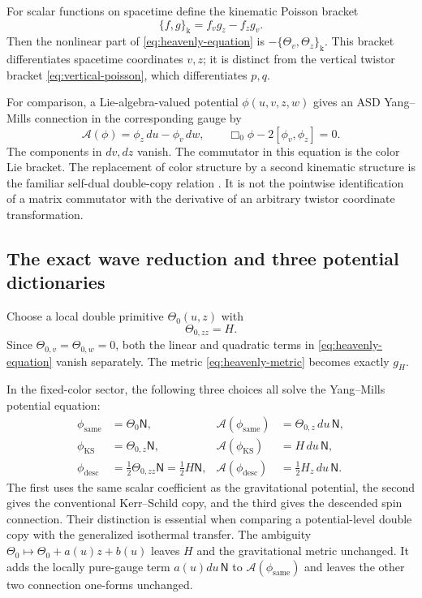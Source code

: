 \documentclass[11pt]{article}
\numberwithin{equation}{section}
\theoremstyle{definition}
\theoremstyle{remark}
\newcommand{\NN}{\mathsf N}
\newcommand{\KS}{\mathrm{KS}}
\begin{document}
For scalar functions on spacetime define the kinematic Poisson bracket
\begin{equation}\label{eq:kinematic-bracket}
\{f,g\}_{\mathrm k}=f_vg_z-f_zg_v.
\end{equation}
Then the nonlinear part of \eqref{eq:heavenly-equation} is $-\{\Theta_v,\Theta_z\}_{\mathrm k}$. This bracket differentiates spacetime coordinates $v,z$; it is distinct from the vertical twistor bracket \eqref{eq:vertical-poisson}, which differentiates $p,q$.

For comparison, a Lie-algebra-valued potential $\phi(u,v,z,w)$ gives an ASD Yang--Mills connection in the corresponding gauge by
\begin{equation}\label{eq:YM-potential}
\mathcal A(\phi)=\phi_z\,du-\phi_v\,dw,
\qquad \Box_0\phi-2[\phi_v,\phi_z]=0.
\end{equation}
The components in $dv,dz$ vanish. The commutator in this equation is the color Lie bracket. The replacement of color structure by a second kinematic structure is the familiar self-dual double-copy relation \cite{MO,BGS}. It is not the pointwise identification of a matrix commutator with the derivative of an arbitrary twistor coordinate transformation.

\subsection{The exact wave reduction and three potential dictionaries}

Choose a local double primitive $\Theta_0(u,z)$ with
\begin{equation}\label{eq:wave-potential}
\Theta_{0,zz}=H.
\end{equation}
Since $\Theta_{0,v}=\Theta_{0,w}=0$, both the linear and quadratic terms in \eqref{eq:heavenly-equation} vanish separately. The metric \eqref{eq:heavenly-metric} becomes exactly $g_H$.

In the fixed-color sector, the following three choices all solve the Yang--Mills potential equation:
\begin{align}
\phi_{\mathrm{same}}&=\Theta_0\NN,
&\mathcal A(\phi_{\mathrm{same}})&=\Theta_{0,z}\,du\,\NN,
\label{eq:same-prepotential}\\
\phi_{\KS}&=\Theta_{0,z}\NN,
&\mathcal A(\phi_{\KS})&=H\,du\,\NN,
\label{eq:KS-prepotential}\\
\phi_{\mathrm{desc}}&=\tfrac12\Theta_{0,zz}\NN=\tfrac12H\NN,
&\mathcal A(\phi_{\mathrm{desc}})&=\tfrac12H_z\,du\,\NN.
\label{eq:desc-prepotential}
\end{align}
The first uses the same scalar coefficient as the gravitational potential, the second gives the conventional Kerr--Schild copy, and the third gives the descended spin connection. Their distinction is essential when comparing a potential-level double copy with the generalized isothermal transfer. The ambiguity $\Theta_0\mapsto\Theta_0+a(u)z+b(u)$ leaves $H$ and the gravitational metric unchanged. It adds the locally pure-gauge term $a(u)du\,\NN$ to $\mathcal A(\phi_{\mathrm{same}})$ and leaves the other two connection one-forms unchanged.
\end{document}
